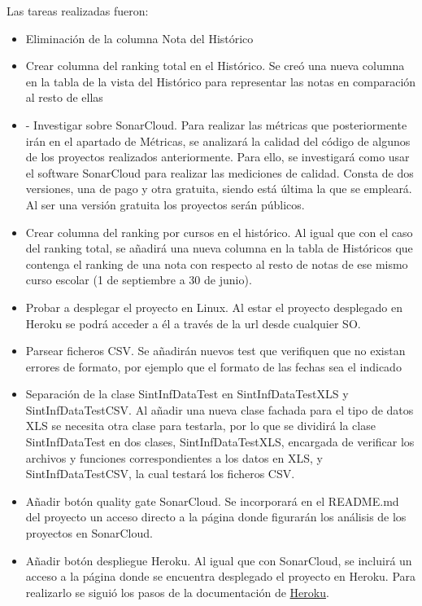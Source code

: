 Las tareas realizadas fueron:
\begin{itemize}
	\tightlist
	\item Eliminación de la columna Nota del Histórico
	\item Crear columna del ranking total en el Histórico. 
	Se creó una nueva columna en la tabla de la vista del Histórico para representar las notas en comparación al resto de ellas
	\item -	Investigar sobre SonarCloud. 
	Para realizar las métricas que posteriormente irán en el apartado de Métricas, se analizará la calidad del código de algunos de los proyectos realizados anteriormente. Para ello, se investigará como usar el software SonarCloud para realizar las mediciones de calidad. Consta de dos versiones, una de pago y otra gratuita, siendo está última la que se empleará. Al ser una versión gratuita los proyectos serán públicos. 
	\item Crear columna del ranking por cursos en el histórico. 
	Al igual que con el caso del ranking total, se añadirá una nueva columna en la tabla de Históricos que contenga el ranking de una nota con respecto al resto de notas de ese mismo curso escolar (1 de septiembre a 30 de junio). 
	\item Probar a desplegar el proyecto en Linux.
	 Al estar el proyecto desplegado en Heroku se podrá acceder a él a través de la url desde cualquier SO.
	\item Parsear ficheros CSV. 
	Se añadirán nuevos test que verifiquen que no existan errores de formato, por ejemplo que el formato de las fechas sea el indicado
	\item Separación de la clase SintInfDataTest en SintInfDataTestXLS y SintInfDataTestCSV.
	 Al añadir una nueva clase fachada para el tipo de datos XLS se necesita otra clase para testarla, por lo que se dividirá la clase SintInfDataTest en dos clases, SintInfDataTestXLS, encargada de verificar los archivos y funciones correspondientes a los datos en XLS, y SintInfDataTestCSV, la cual testará los ficheros CSV.
	 \item Añadir botón quality gate SonarCloud. 
	 Se incorporará en el README.md del proyecto un acceso directo a la página donde figurarán los análisis de los proyectos en SonarCloud. 
	 \item Añadir botón despliegue Heroku.
	  Al igual que con SonarCloud, se incluirá un acceso a la página donde se encuentra desplegado el proyecto en Heroku. Para realizarlo se siguió los pasos de la documentación de \href{https://devcenter.heroku.com/articles/heroku-button}{Heroku}.

\end{itemize}
